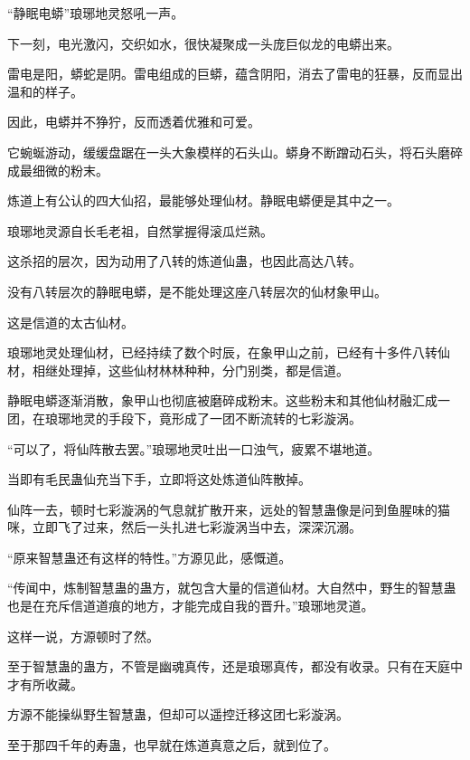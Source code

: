 
\begin{this_body}



“静眠电蟒”琅琊地灵怒吼一声。

下一刻，电光激闪，交织如水，很快凝聚成一头庞巨似龙的电蟒出来。

雷电是阳，蟒蛇是阴。雷电组成的巨蟒，蕴含阴阳，消去了雷电的狂暴，反而显出温和的样子。

因此，电蟒并不狰狞，反而透着优雅和可爱。

它蜿蜒游动，缓缓盘踞在一头大象模样的石头山。蟒身不断蹭动石头，将石头磨碎成最细微的粉末。

炼道上有公认的四大仙招，最能够处理仙材。静眠电蟒便是其中之一。

琅琊地灵源自长毛老祖，自然掌握得滚瓜烂熟。

这杀招的层次，因为动用了八转的炼道仙蛊，也因此高达八转。

没有八转层次的静眠电蟒，是不能处理这座八转层次的仙材象甲山。

这是信道的太古仙材。

琅琊地灵处理仙材，已经持续了数个时辰，在象甲山之前，已经有十多件八转仙材，相继处理掉，这些仙材林林种种，分门别类，都是信道。

静眠电蟒逐渐消散，象甲山也彻底被磨碎成粉末。这些粉末和其他仙材融汇成一团，在琅琊地灵的手段下，竟形成了一团不断流转的七彩漩涡。

“可以了，将仙阵散去罢。”琅琊地灵吐出一口浊气，疲累不堪地道。

当即有毛民蛊仙充当下手，立即将这处炼道仙阵散掉。

仙阵一去，顿时七彩漩涡的气息就扩散开来，远处的智慧蛊像是问到鱼腥味的猫咪，立即飞了过来，然后一头扎进七彩漩涡当中去，深深沉溺。

“原来智慧蛊还有这样的特性。”方源见此，感慨道。

“传闻中，炼制智慧蛊的蛊方，就包含大量的信道仙材。大自然中，野生的智慧蛊也是在充斥信道道痕的地方，才能完成自我的晋升。”琅琊地灵道。

这样一说，方源顿时了然。

至于智慧蛊的蛊方，不管是幽魂真传，还是琅琊真传，都没有收录。只有在天庭中才有所收藏。

方源不能操纵野生智慧蛊，但却可以遥控迁移这团七彩漩涡。

至于那四千年的寿蛊，也早就在炼道真意之后，就到位了。


\end{this_body}
